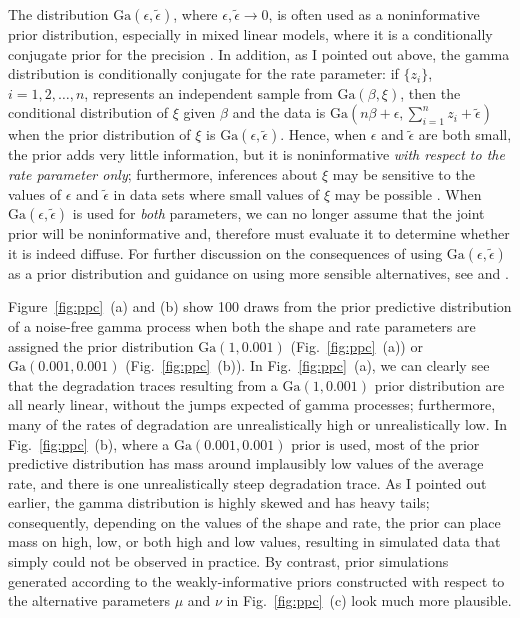 The distribution $\mbox{Ga}(\epsilon, \tilde{\epsilon})$, where $\epsilon, \tilde{\epsilon}\longrightarrow 0$, is often used as a noninformative prior distribution, especially in mixed linear models, where it is a conditionally conjugate prior for the precision \citep[p.~33]{hodges_2014}. In addition, as I pointed out above, the gamma distribution is conditionally conjugate for the rate parameter: if $\{ z_i \}$, $i = 1, 2, \ldots, n$, represents an independent sample from $\mbox{Ga}(\beta, \xi)$, then the conditional distribution of $\xi$ given $\beta$ and the data is $\mbox{Ga}(n\beta + \epsilon, \sum_{i=1}^n z_i + \tilde{\epsilon})$ when the prior distribution of $\xi$ is $\mbox{Ga}(\epsilon, \tilde{\epsilon})$. Hence, when $\epsilon$ and $\tilde{\epsilon}$ are both small, the prior adds very little information, but it is noninformative \textit{with respect to the rate parameter only}; furthermore, inferences about $\xi$ may be sensitive to the values of $\epsilon$ and $\tilde{\epsilon}$ in data sets where small values of $\xi$ may be possible \citep[p.~130]{gelman_workflow_2020}. When $\mbox{Ga}(\epsilon, \tilde{\epsilon})$ is used for \textit{both} parameters, we can no longer assume that the joint prior will be noninformative and, therefore must evaluate it to determine whether it is indeed diffuse. For further discussion on the consequences of using $\mbox{Ga}(\epsilon, \tilde{\epsilon})$ as a prior distribution and guidance on using more sensible alternatives, see \citet{hodges_2014} and \citet{gelman_workflow_2020}.

Figure~\ref{fig:ppc}~(a) and (b) show 100 draws from the prior predictive distribution of a noise-free gamma process when both the shape and rate parameters are assigned the prior distribution $\mbox{Ga}(1, 0.001)$ (Fig.~\ref{fig:ppc}~(a)) or $\mbox{Ga}(0.001, 0.001)$ (Fig.~\ref{fig:ppc}~(b)). In Fig.~\ref{fig:ppc}~(a), we can clearly see that the degradation traces resulting from a $\mbox{Ga}(1, 0.001)$ prior distribution are all nearly linear, without the jumps expected of gamma processes; furthermore, many of the rates of degradation are unrealistically high or unrealistically low. In Fig.~\ref{fig:ppc}~(b), where a $\mbox{Ga}(0.001, 0.001)$ prior is used, most of the prior predictive distribution has mass around implausibly low values of the average rate, and there is one unrealistically steep degradation trace. As I pointed out earlier, the gamma distribution is highly skewed and has heavy tails; consequently, depending on the values of the shape and rate, the prior can place mass on high, low, or both high and low values, resulting in simulated data that simply could not be observed in practice. By contrast, prior simulations generated according to the weakly-informative priors constructed with respect to the alternative parameters $\mu$ and $\nu$ in Fig.~\ref{fig:ppc}~(c) look much more plausible.

